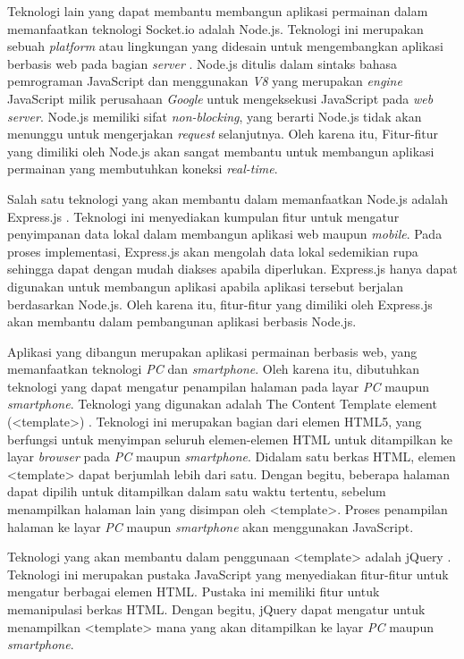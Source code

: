 Teknologi lain yang dapat membantu membangun aplikasi permainan dalam memanfaatkan teknologi Socket.io adalah Node.js. Teknologi ini merupakan sebuah \textit{platform} atau lingkungan yang didesain untuk mengembangkan aplikasi berbasis web pada bagian \textit{server} \cite{nodeFound:09:nodejsdocs}. Node.js ditulis dalam sintaks bahasa pemrograman JavaScript dan menggunakan \textit{V8} yang merupakan \textit{engine} JavaScript milik perusahaan \textit{Google} untuk mengeksekusi JavaScript pada \textit{web server}. Node.js memiliki sifat \textit{non-blocking}, yang berarti Node.js tidak akan menunggu untuk mengerjakan \textit{request} selanjutnya. Oleh karena itu, Fitur-fitur yang dimiliki oleh Node.js akan sangat membantu untuk membangun aplikasi permainan yang membutuhkan koneksi \textit{real-time}.

Salah satu teknologi yang akan membantu dalam memanfaatkan Node.js adalah Express.js \cite{nodeFound:10:expressjsapi}. Teknologi ini menyediakan kumpulan fitur untuk mengatur penyimpanan data lokal dalam membangun aplikasi web maupun \textit{mobile}. Pada proses implementasi, Express.js akan mengolah data lokal sedemikian rupa sehingga dapat dengan mudah diakses apabila diperlukan. Express.js hanya dapat digunakan untuk membangun aplikasi apabila aplikasi tersebut berjalan berdasarkan Node.js. Oleh karena itu, fitur-fitur yang dimiliki oleh Express.js akan membantu dalam pembangunan aplikasi berbasis Node.js.

Aplikasi yang dibangun merupakan aplikasi permainan berbasis web, yang memanfaatkan teknologi \textit{PC} dan \textit{smartphone}. Oleh karena itu, dibutuhkan teknologi yang dapat mengatur penampilan halaman pada layar \textit{PC} maupun \textit{smartphone}. Teknologi yang digunakan adalah The Content Template element (<template>) \cite{moz:05:template}. Teknologi ini merupakan bagian dari elemen HTML5, yang berfungsi untuk menyimpan seluruh elemen-elemen HTML untuk ditampilkan ke layar \textit{browser} pada \textit{PC} maupun \textit{smartphone}. Didalam satu berkas HTML, elemen <template> dapat berjumlah lebih dari satu. Dengan begitu, beberapa halaman dapat dipilih untuk ditampilkan dalam satu waktu tertentu, sebelum menampilkan halaman lain yang disimpan oleh <template>. Proses penampilan halaman ke layar \textit{PC} maupun \textit{smartphone} akan menggunakan JavaScript.

Teknologi yang akan membantu dalam penggunaan <template> adalah jQuery \cite{jqFound:06:jQueryAPI}. Teknologi ini merupakan pustaka JavaScript yang menyediakan fitur-fitur untuk mengatur berbagai elemen HTML. Pustaka ini memiliki fitur untuk memanipulasi berkas HTML. Dengan begitu, jQuery dapat mengatur untuk menampilkan <template> mana yang akan ditampilkan ke layar \textit{PC} maupun \textit{smartphone}.

